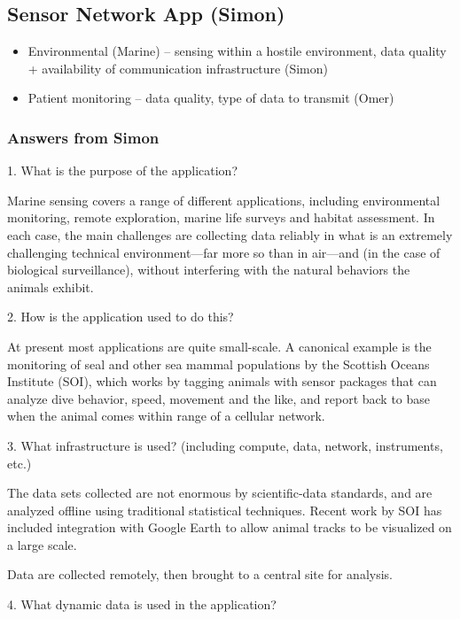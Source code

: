 \documentclass[preprint,12pt]{article}
\begin{document}
\subsection{Sensor Network App (Simon) \label{sensorSimon}}

\begin{itemize}
\item Environmental (Marine) -- sensing within a hostile environment,
  data quality + availability of communication infrastructure (Simon)
\item Patient monitoring -- data quality, type of data to transmit
  (Omer)
\end{itemize}

\subsubsection{Answers from Simon}

1. What is the purpose of the application?

Marine sensing covers a range of different applications, including
environmental monitoring, remote exploration, marine life surveys and
habitat assessment. In each case, the main challenges are collecting
data reliably in what is an extremely challenging technical
environment---far more so than in air---and (in the case of biological
surveillance), without interfering with the natural behaviors the
animals exhibit.

2. How is the application used to do this?

At present most applications are quite small-scale. A canonical example
is the monitoring of seal and other sea mammal populations by the
Scottish Oceans Institute (SOI), which works by tagging animals with sensor
packages that can analyze dive behavior, speed, movement and the like,
and report back to base when the animal comes within range of a cellular
network.

3. What infrastructure is used? (including compute, data, network, instruments, etc.)

The data sets collected are not enormous by scientific-data standards,
and are analyzed offline using traditional statistical techniques.
Recent work by SOI has included integration with Google Earth to allow
animal tracks to be visualized on a large scale.

Data are collected remotely, then brought to a central site for analysis.

4. What dynamic data is used in the application?
\end{document}
